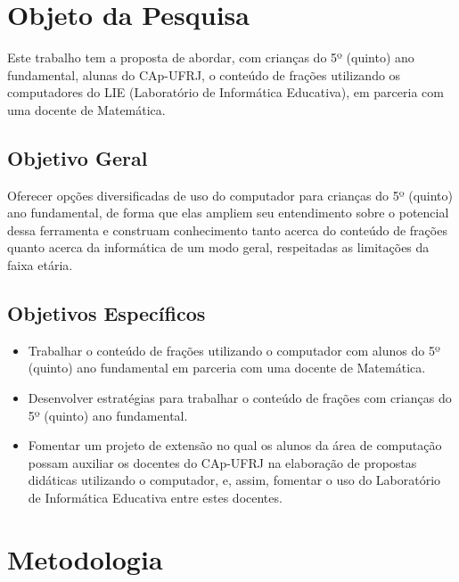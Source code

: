 \section{Objeto da Pesquisa}\label{chp:LABEL_CHP_INT_SEC_OBJ}

Este trabalho tem a proposta de abordar, com crianças do 5º (quinto) ano fundamental, alunas do CAp-UFRJ, o conteúdo de frações utilizando os computadores do LIE (Laboratório de Informática Educativa), em parceria com uma docente de Matemática.

\subsection{Objetivo Geral}\label{chp:LABEL_CHP_INT_SEC_OBJ_SUBSEC_OBJ_GER}

Oferecer opções diversificadas de uso do computador para crianças do 5º (quinto) ano fundamental, de forma que elas ampliem seu entendimento sobre o potencial dessa ferramenta e construam conhecimento tanto acerca do conteúdo de frações quanto acerca da informática de um modo geral, respeitadas as limitações da faixa etária.

\subsection{Objetivos Específicos}\label{chp:LABEL_CHP_INT_SEC_OBJ_SUBSEC_OBJ_ESP}

\begin{itemize}
\item Trabalhar o conteúdo de frações utilizando o computador com alunos do 5º (quinto) ano fundamental em parceria com uma docente de Matemática.

\item Desenvolver estratégias para trabalhar o conteúdo de frações com crianças do 5º (quinto) ano fundamental.

\item Fomentar um projeto de extensão no qual os alunos da área de computação possam auxiliar os docentes do CAp-UFRJ na elaboração de propostas didáticas utilizando o computador, e, assim, fomentar o uso do Laboratório de Informática Educativa entre estes docentes.
\end{itemize}

\section{Metodologia}\label{chp:LABEL_CHP_INT_SEC_MET}

